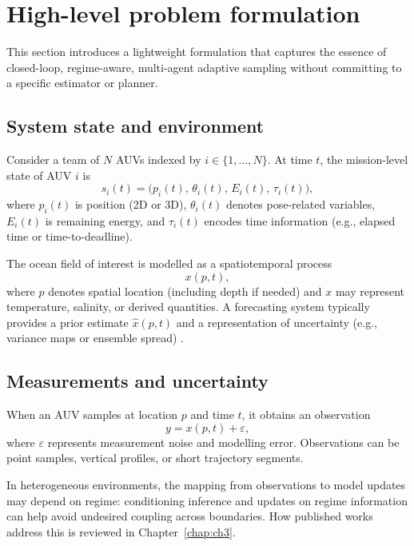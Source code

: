 \section{High-level problem formulation} \label{sec:problem_formulation}

This section introduces a lightweight formulation that captures the essence of closed-loop, regime-aware,
multi-agent adaptive sampling without committing to a specific estimator or planner.

\subsection{System state and environment}
Consider a team of $N$ AUVs indexed by $i \in \{1,\dots,N\}$. At time $t$, the mission-level state of AUV $i$ is
\begin{equation}
  s_i(t) = \big(p_i(t),\, \theta_i(t),\, E_i(t),\, \tau_i(t)\big),
\end{equation}
where $p_i(t)$ is position (2D or 3D), $\theta_i(t)$ denotes pose-related variables, $E_i(t)$ is remaining energy,
and $\tau_i(t)$ encodes time information (e.g., elapsed time or time-to-deadline).

The ocean field of interest is modelled as a spatiotemporal process
\begin{equation}
  x(p,t),
\end{equation}
where $p$ denotes spatial location (including depth if needed) and $x$ may represent temperature, salinity,
or derived quantities. A forecasting system typically provides a prior estimate $\hat{x}(p,t)$ and a representation
of uncertainty (e.g., variance maps or ensemble spread) \parencite{guo2025orcadl}.

\subsection{Measurements and uncertainty}
When an AUV samples at location $p$ and time $t$, it obtains an observation
\begin{equation}
  y = x(p,t) + \varepsilon,
\end{equation}
where $\varepsilon$ represents measurement noise and modelling error. Observations can be point samples,
vertical profiles, or short trajectory segments.

In heterogeneous environments, the mapping from observations to model updates may depend on regime:
conditioning inference and updates on regime information can help avoid undesired coupling across boundaries.
How published works address this is reviewed in Chapter~\ref{chap:ch3}.

